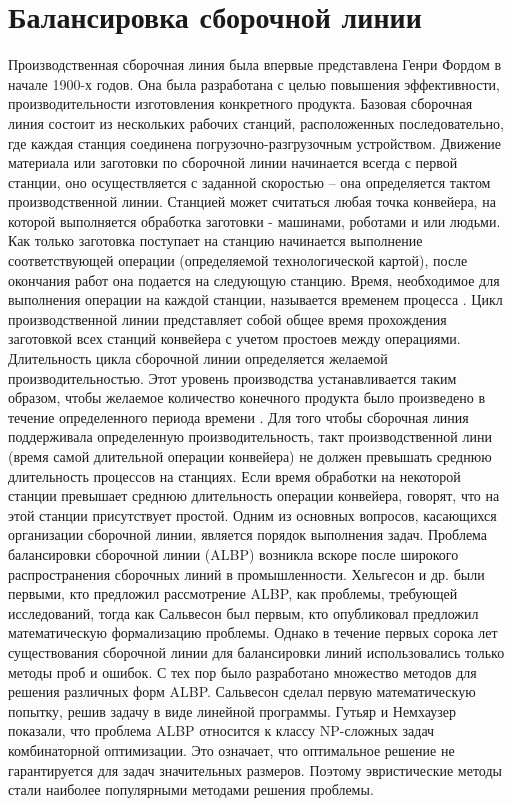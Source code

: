 \section{Балансировка сборочной линии}

Производственная сборочная линия была впервые представлена Генри Фордом в начале 1900-х годов. 
Она была разработана с целью повышения эффективности, производительности изготовления конкретного продукта.
Базовая сборочная линия состоит из нескольких рабочих станций, расположенных последовательно, где каждая станция соединена погрузочно-разгрузочным устройством.
Движение материала или заготовки по сборочной линии начинается всегда с первой станции, оно осуществляется с заданной скоростью – она определяется тактом производственной линии.
Станцией может считаться любая точка конвейера, на которой выполняется обработка заготовки - машинами, роботами и или людьми.
Как только заготовка поступает на станцию начинается выполнение соответствующей операции (определяемой технологической картой), после окончания работ она подается на следующую станцию.
Время, необходимое для выполнения операции на каждой станции, называется временем процесса \cite{Sury}.
Цикл производственной линии представляет собой общее время прохождения заготовкой всех станций конвейера с учетом простоев между операциями.
Длительность цикла сборочной линии определяется желаемой производительностью.
Этот уровень производства устанавливается таким образом, чтобы желаемое количество конечного продукта было произведено в течение определенного периода времени \cite{Baybars}.
Для того чтобы сборочная линия поддерживала определенную производительность, такт производственной лини (время самой длительной операции конвейера) не должен превышать среднюю длительность процессов на станциях.
Если время обработки на некоторой станции превышает среднюю длительность операции конвейера, говорят, что на этой станции присутствует простой.
Одним из основных вопросов, касающихся организации сборочной линии, является порядок выполнения задач.
Проблема балансировки сборочной линии (ALBP) возникла вскоре после широкого распространения сборочных линий в промышленности.
Хельгесон и др.
\cite{Helgeson} были первыми, кто предложил рассмотрение ALBP, как проблемы, требующей исследований, тогда как Сальвесон \cite{Salveson} был первым, кто опубликовал предложил математическую формализацию проблемы.
Однако в течение первых сорока лет существования сборочной линии для балансировки линий использовались только методы проб и ошибок.
С тех пор было разработано множество методов для решения различных форм ALBP.
Сальвесон \cite{Salveson} сделал первую математическую попытку, решив задачу в виде линейной программы.
Гутьяр и Немхаузер \cite{Gutjahr} показали, что проблема ALBP относится к классу NP-сложных задач комбинаторной оптимизации. 
Это означает, что оптимальное решение не гарантируется для задач значительных размеров. 
Поэтому эвристические методы стали наиболее популярными методами решения проблемы.



